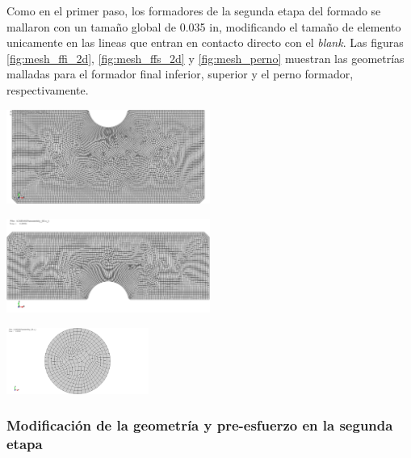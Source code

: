 Como en el primer paso, los formadores de la segunda etapa del formado se mallaron con un tamaño global de 0.035 in, 
modificando el tamaño de elemento unicamente en las lineas que entran en contacto directo con el \textit{blank}.
Las figuras \ref{fig:mesh_ffi_2d}, \ref{fig:mesh_ffs_2d} y \ref{fig:mesh_perno} muestran las geometrías malladas 
para el formador final inferior, superior y el perno formador, respectivamente.

\begin{center}
\includegraphics[width=0.5\textwidth]{src/ch3/mesh_ffi_2d.png}
\label{fig:mesh_ffi_2d}
\end{center}

\begin{center}
\includegraphics[width=0.5\textwidth]{src/ch3/mesh_ffs_2d.png}
\label{fig:mesh_ffs_2d}
\end{center}

\begin{center}
\includegraphics[width=0.35\textwidth]{src/ch3/mesh_perno_2d.png}
\label{fig:mesh_perno}
\end{center}


\subsubsection{Modificación de la geometría y pre-esfuerzo en la segunda etapa}\label{sec:initial-stress}

